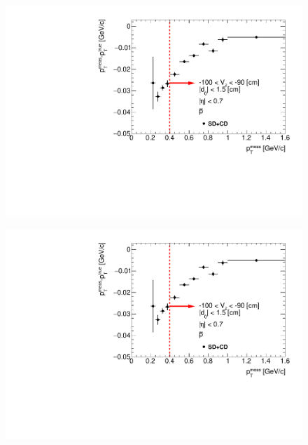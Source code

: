 \begin{figure}[H]
{  \includegraphics[width=\linewidth,page=37]{graphics/energyLoss/energyLoss3DGlobal_OnePrtAlso.pdf}\\
}%
\end{figure}

\begin{figure}[H]\ContinuedFloat
\vspace{-3.5em}
\parbox{0.329\textwidth}{
  \includegraphics[width=\linewidth,page=38]{graphics/energyLoss/energyLoss3DGlobal_OnePrtAlso.pdf}\\
  \vspace{-4em}
}~
\end{figure}